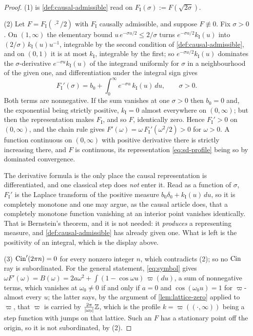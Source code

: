 \begin{proof}\leanok
(1) is \ref{def:causal-admissible} read on $F_{\mathrm I}(\sigma) := F(\sqrt{2\sigma})$.

(2) Let $F = F_{\mathrm I}(\cdot^2/2)$ with $F_{\mathrm I}$ causally admissible, and suppose
$F \not\equiv 0$. Fix $\sigma > 0$. On $(1,\infty)$ the elementary bound
$u\,e^{-\sigma u/2} \le 2/\sigma$ turns $e^{-\sigma u/2}k_{\mathrm I}(u)$ into
$(2/\sigma)\,k_{\mathrm I}(u)u^{-1}$, integrable by the second condition of
\ref{def:causal-admissible}, and on $(0,1)$ it is at most $k_{\mathrm I}$, integrable by the
first; so $e^{-\sigma u/2}k_{\mathrm I}(u)$ dominates the $\sigma$-derivative
$e^{-\sigma u}k_{\mathrm I}(u)$ of the integrand uniformly for $\sigma$ in a neighbourhood of
the given one, and differentiation under the integral sign gives
\[
  F_{\mathrm I}'(\sigma) = b_0 + \int_0^\infty e^{-\sigma u}\,k_{\mathrm I}(u)\,du,
  \qquad \sigma > 0 .
\]
Both terms are nonnegative. If the sum vanishes at one $\sigma > 0$ then $b_0 = 0$ and, the
exponential being strictly positive, $k_{\mathrm I} = 0$ almost everywhere on $(0,\infty)$;
but then the representation makes $F_{\mathrm I}$, and so $F$, identically zero. Hence
$F_{\mathrm I}' > 0$ on $(0,\infty)$, and the chain rule gives
$F'(\omega) = \omega\,F_{\mathrm I}'(\omega^2/2) > 0$ for $\omega > 0$. A function continuous
on $(0,\infty)$ with positive derivative there is strictly increasing there, and $F$ is
continuous, its representation \ref{eq:sd-profile} being so by dominated convergence.

The derivative formula is the only place the causal representation is differentiated, and one
classical step does \emph{not} enter it. Read as a function of $\sigma$, $F_{\mathrm I}'$ is
the Laplace transform of the positive measure $b_0\delta_0 + k_{\mathrm I}(u)\,du$, so it is
completely monotone and one may argue, as the causal article does, that a completely monotone
function vanishing at an interior point vanishes identically. That is Bernstein's theorem, and
it is not needed: it \emph{produces} a representing measure, and \ref{def:causal-admissible}
has already given one. What is left is the positivity of an integral, which is the display
above.

(3) $\operatorname{Cin}'(2\pi n) = 0$ for every nonzero integer $n$, which contradicts (2); so no $\operatorname{Cin}$ ray
is subordinated. For the general statement, \ref{eq:symbol} gives
$\omega F'(\omega) = B(\omega) = 2a\omega^2 + \int (1 - \cos\omega u)\,\varpi(du)$, a sum of
nonnegative terms, which vanishes at $\omega_0 \ne 0$ if and only if $a = 0$ and
$\cos(\omega_0 u) = 1$ for $\varpi$-almost every $u$; the latter says, by the argument of
\ref{lem:lattice-zero} applied to $\varpi$, that $\varpi$ is carried by
$\tfrac{2\pi}{|\omega_0|}\mathbb{Z}$, which is the profile $k = \varpi((\cdot,\infty))$ being a step
function with jumps on that lattice. Such an $F$ has a stationary point off the origin, so it
is not subordinated, by (2).


\end{proof}

